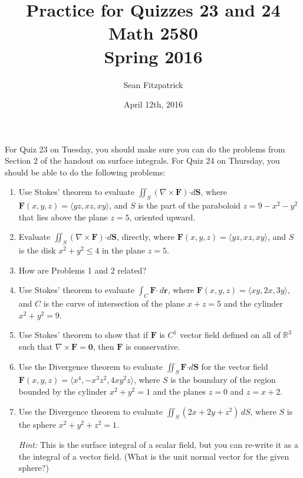 \documentclass[letterpaper,12pt]{article}
\title{Practice for Quizzes 23 and 24\\Math 2580\\Spring 2016}
\author{Sean Fitzpatrick}
\date{April 12th, 2016}
\newcommand{\R}{\mathbb{R}}
\renewcommand{\r}{\mathbf{r}}
\newcommand{\dotp}{\boldsymbol{\cdot}}
\newcommand{\F}{\mathbf{F}}
\begin{document}
 \maketitle

For Quiz 23 on Tuesday, you should make sure you can do the problems from Section 2 of the handout on surface integrals.
For Quiz 24 on Thursday, you should be able to do the following problems:
\begin{enumerate}
 \item Use Stokes' theorem to evaluate $\iint_S(\nabla\times \F)\dotp d\mathbf{S}$, where $\F(x,y,z)=\langle yz, xz, xy\rangle$, and $S$ is the part of the paraboloid $z=9-x^2-y^2$ that lies above the plane $z=5$, oriented upward.
 \item Evaluate $\iint_S(\nabla\times \F)\dotp d\mathbf{S}$, directly, where $\F(x,y,z)=\langle yz, xz, xy\rangle$, and $S$ is the disk $x^2+y^2\leq 4$ in the plane $z=5$.
 \item How are Problems 1 and 2 related?
 \item Use Stokes' theorem to evaluate $\int_C\F\dotp \,d\r$, where $\F(x,y,z) = \langle xy, 2x, 3y\rangle$, and $C$ is the curve of intersection of the plane $x+z=5$ and the cylinder $x^2+y^2=9$.
 \item Use Stokes' theorem to show that if $\F$ is $C^1$ vector field defined on all of $\R^3$ such that $\nabla\times \F = \mathbf{0}$, then $\F$ is conservative.
 \item Use the Divergence theorem to evaluate $\iint_S\F\dotp d\mathbf{S}$ for the vector field $\F(x,y,z) = \langle x^4,-x^3z^2, 4xy^2z\rangle$, where $S$ is the boundary of the region bounded by the cylinder $x^2+y^2=1$ and the planes $z=0$ and $z=x+2$.
 \item Use the Divergence theorem to evaluate $\iint_S(2x+2y+z^2)\,dS$, where $S$ is the sphere $x^2+y^2+z^2=1$.

\textit{Hint:} This is the surface integral of a scalar field, but you can re-write it as a the integral of a vector field. (What is the unit normal vector for the given sphere?)
\end{enumerate}
\end{document}
